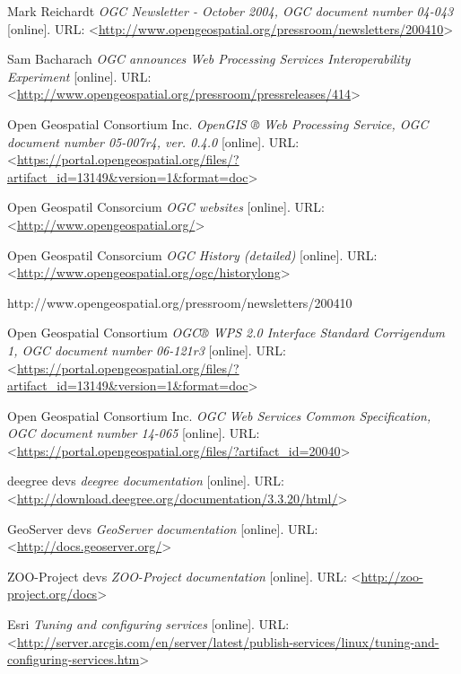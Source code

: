 \documentclass[12pt,a4paper]{article}
\begin{document}
\newpage
\begin{thebibliography}{99}
\label{Bibliography}
Mark Reichardt \textit{OGC Newsletter - October 2004, OGC document number 04-043} [online].
URL: \textless\url{http://www.opengeospatial.org/pressroom/newsletters/200410}\textgreater

Sam Bacharach \textit{OGC announces Web Processing Services Interoperability Experiment} [online].
URL: \textless\url{http://www.opengeospatial.org/pressroom/pressreleases/414}\textgreater

Open Geospatial Consortium Inc. \textit{OpenGIS ® Web Processing Service, OGC document number 05-007r4, ver. 0.4.0} [online].
URL: \textless\url{https://portal.opengeospatial.org/files/?artifact_id=13149&version=1&format=doc}\textgreater

Open Geospatil Consorcium \textit{OGC websites} [online].
URL: \textless\url{http://www.opengeospatial.org/}\textgreater

Open Geospatil Consorcium \textit{OGC History (detailed)} [online].
URL: \textless\url{http://www.opengeospatial.org/ogc/historylong}\textgreater

http://www.opengeospatial.org/pressroom/newsletters/200410

Open Geospatial Consortium \textit{OGC® WPS 2.0 Interface Standard Corrigendum 1, OGC document number 06-121r3} [online].
URL: \textless\url{https://portal.opengeospatial.org/files/?artifact_id=13149&version=1&format=doc}\textgreater

Open Geospatial Consortium Inc. \textit{OGC Web Services Common Specification, OGC document number 14-065} [online].
URL: \textless\url{https://portal.opengeospatial.org/files/?artifact_id=20040}\textgreater

deegree devs \textit{deegree documentation} [online].
URL: \textless\url{http://download.deegree.org/documentation/3.3.20/html/}\textgreater

GeoServer devs \textit{GeoServer documentation} [online].
URL: \textless\url{http://docs.geoserver.org/}\textgreater

ZOO-Project devs \textit{ZOO-Project documentation} [online].
URL: \textless\url{http://zoo-project.org/docs}\textgreater

Esri \textit{Tuning and configuring services} [online].
URL: \textless\url{http://server.arcgis.com/en/server/latest/publish-services/linux/tuning-and-configuring-services.htm}\textgreater


\end{thebibliography}
\end{document}
